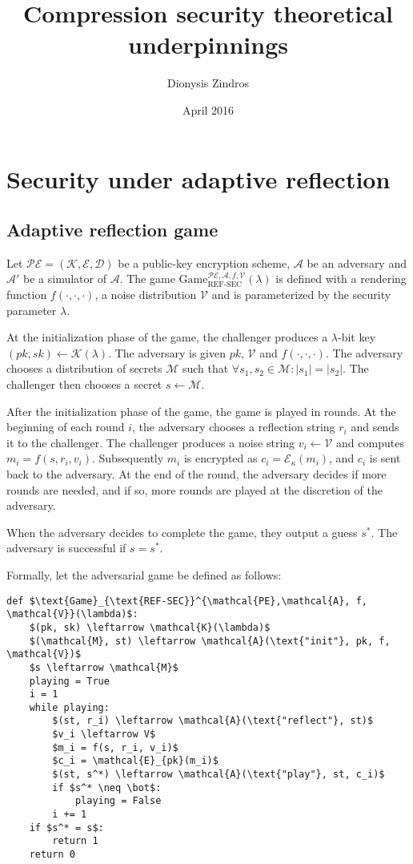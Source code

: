 \documentclass{article}
\title{Compression security theoretical underpinnings}
\author{Dionysis Zindros}
\date{April 2016}
\begin{document}
\maketitle

\section*{Security under adaptive reflection}

\subsection*{Adaptive reflection game}

Let $\mathcal{PE} = (\mathcal{K}, \mathcal{E}, \mathcal{D})$ be a public-key
encryption scheme, $\mathcal{A}$ be an adversary and $\mathcal{A'}$ be a
simulator of $\mathcal{A}$.  The game
$\text{Game}_{\text{REF-SEC}}^{\mathcal{PE},\mathcal{A}, f,
\mathcal{V}}(\lambda)$ is defined with a rendering function $f(\cdot, \cdot,
\cdot)$, a noise distribution $\mathcal{V}$ and is parameterized by the
security parameter $\lambda$.

At the initialization phase of the game, the challenger produces a
$\lambda$-bit key $(pk, sk) \leftarrow \mathcal{K}(\lambda)$. The adversary is
given $pk$, $\mathcal{V}$ and $f(\cdot, \cdot, \cdot)$.  The adversary chooses
a distribution of secrets $\mathcal{M}$ such that $\forall s_1, s_2 \in
\mathcal{M}: |s_1| = |s_2|$.  The challenger then chooses a secret $s
\leftarrow \mathcal{M}$.

After the initialization phase of the game, the game is played in rounds. At
the beginning of each round $i$, the adversary chooses a reflection string
$r_i$ and sends it to the challenger. The challenger produces a noise string
$v_i \leftarrow \mathcal{V}$ and computes $m_i = f(s, r_i, v_i)$.  Subsequently
$m_i$ is encrypted as $c_i = \mathcal{E}_\kappa(m_i)$, and $c_i$ is sent back
to the adversary. At the end of the round, the adversary  decides if more
rounds are needed, and if so, more rounds are played at the discretion of the
adversary.

When the adversary decides to complete the game, they output a guess $s^*$. The
adversary is successful if $s = s^*$.

Formally, let the adversarial game be defined as follows:

\begin{lstlisting}[texcl,mathescape]
def $\text{Game}_{\text{REF-SEC}}^{\mathcal{PE},\mathcal{A}, f,
\mathcal{V}}(\lambda)$:
    $(pk, sk) \leftarrow \mathcal{K}(\lambda)$
    $(\mathcal{M}, st) \leftarrow \mathcal{A}(\text{"init"}, pk, f, \mathcal{V})$
    $s \leftarrow \mathcal{M}$
    playing = True
    i = 1
    while playing:
        $(st, r_i) \leftarrow \mathcal{A}(\text{"reflect"}, st)$
        $v_i \leftarrow V$
        $m_i = f(s, r_i, v_i)$
        $c_i = \mathcal{E}_{pk}(m_i)$
        $(st, s^*) \leftarrow \mathcal{A}(\text{"play"}, st, c_i)$
        if $s^* \neq \bot$:
            playing = False
        i += 1
    if $s^* = s$:
        return 1
    return 0
\end{lstlisting}
\end{document}
